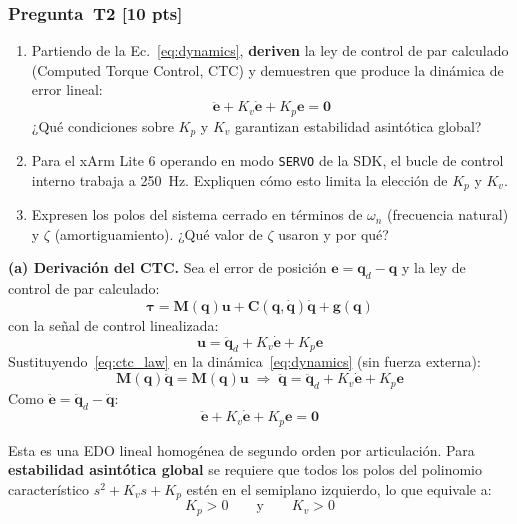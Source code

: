 \documentclass[journal,10pt,twoside]{IEEEtran}
\newcommand{\pts}[1]{\textcolor{tec_red}{\textbf{[#1 pts]}}}
\begin{document}
\subsubsection*{Pregunta~T2 \pts{10}}
\begin{enumerate}[label=(\alph*)]
  \item Partiendo de la Ec.~\eqref{eq:dynamics}, \textbf{deriven} la
        ley de control de par calculado (Computed Torque Control, CTC)
        y demuestren que produce la dinámica de error lineal:
        \[
          \ddot{\bm{e}} + K_v\dot{\bm{e}} + K_p\bm{e} = \bm{0}
        \]
        ¿Qué condiciones sobre $K_p$ y $K_v$ garantizan
        estabilidad asintótica global?
  \item Para el xArm Lite 6 operando en modo \texttt{SERVO} de
        la SDK, el bucle de control interno trabaja a 250~Hz.
        Expliquen cómo esto limita la elección de $K_p$ y $K_v$.
  \item Expresen los polos del sistema cerrado en términos de
        $\omega_n$ (frecuencia natural) y $\zeta$ (amortiguamiento).
        ¿Qué valor de $\zeta$ usaron y por qué?
\end{enumerate}

\textbf{(a) Derivación del CTC.}
Sea el error de posición $\bm{e} = \bm{q}_d - \bm{q}$ y la ley
de control de par calculado:
\begin{equation}
  \bm{\tau} = \bm{M}(\bm{q})\bm{u} + \bm{C}(\bm{q},\dot{\bm{q}})\dot{\bm{q}}
              + \bm{g}(\bm{q})
  \label{eq:ctc_law}
\end{equation}
con la señal de control linealizada:
\[
  \bm{u} = \ddot{\bm{q}}_d + K_v\dot{\bm{e}} + K_p\bm{e}
\]
Sustituyendo~\eqref{eq:ctc_law} en la dinámica~\eqref{eq:dynamics}
(sin fuerza externa):
\[
  \bm{M}(\bm{q})\ddot{\bm{q}} = \bm{M}(\bm{q})\bm{u}
  \;\Rightarrow\;
  \ddot{\bm{q}} = \ddot{\bm{q}}_d + K_v\dot{\bm{e}} + K_p\bm{e}
\]
Como $\ddot{\bm{e}} = \ddot{\bm{q}}_d - \ddot{\bm{q}}$:
\begin{equation}
  \ddot{\bm{e}} + K_v\dot{\bm{e}} + K_p\bm{e} = \bm{0}
  \label{eq:ctc_error}
\end{equation}

Esta es una EDO lineal homogénea de segundo orden por articulación.
Para \textbf{estabilidad asintótica global} se requiere que todos los
polos del polinomio característico $s^2 + K_v s + K_p$ estén en el
semiplano izquierdo, lo que equivale a:
\[
  K_p > 0 \qquad \text{y} \qquad K_v > 0
\]
\end{document}
